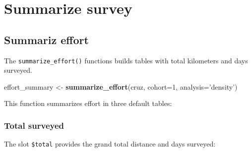 \documentclass[
]{book}
\newenvironment{Shaded}{\begin{snugshade}}{\end{snugshade}}
\newcommand{\DataTypeTok}[1]{\textcolor[rgb]{0.13,0.29,0.53}{#1}}
\newcommand{\DecValTok}[1]{\textcolor[rgb]{0.00,0.00,0.81}{#1}}
\newcommand{\KeywordTok}[1]{\textcolor[rgb]{0.13,0.29,0.53}{\textbf{#1}}}
\newcommand{\NormalTok}[1]{#1}
\newcommand{\OperatorTok}[1]{\textcolor[rgb]{0.81,0.36,0.00}{\textbf{#1}}}
\newcommand{\StringTok}[1]{\textcolor[rgb]{0.31,0.60,0.02}{#1}}
\begin{document}
\hypertarget{summarize}{%
\chapter{Summarize survey}\label{summarize}}

\hypertarget{summariz-effort}{%
\section*{Summariz effort}\label{summariz-effort}}

The \texttt{summarize\_effort()} functions builds tables with total kilometers and days surveyed.

\begin{Shaded}
\begin{Highlighting}[]
\NormalTok{effort_summary <-}\StringTok{ }\KeywordTok{summarize_effort}\NormalTok{(cruz,}
                                      \DataTypeTok{cohort=}\DecValTok{1}\NormalTok{,}
                                      \DataTypeTok{analysis=}\StringTok{'density'}\NormalTok{)}
\end{Highlighting}
\end{Shaded}

This function summarizes effort in three default tables:

\begin{Shaded}
\end{Shaded}

\hypertarget{total-surveyed}{%
\subsection*{Total surveyed}\label{total-surveyed}}

The slot \texttt{\$total} provides the grand total distance and days surveyed:

\begin{Shaded}
\end{Shaded}
\end{document}
